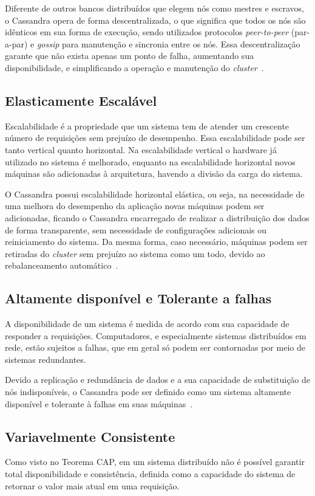 Diferente de outros bancos distribuídos que elegem nós como mestres e escravos, o Cassandra opera de forma descentralizada, o que significa que todos os nós são idênticos em sua forma de execução, sendo utilizados protocolos \emph{peer-to-peer} (par-a-par) e \emph{gossip} para manutenção e sincronia entre os nós. Essa descentralização garante que não exista apenas um ponto de falha, aumentando sua disponibilidade, e simplificando a operação e manutenção do \emph{cluster}~\cite{cassandraguide}.

\subsection*{Elasticamente Escalável}
Escalabilidade é a propriedade que um sistema tem de atender um crescente número de requisições sem prejuízo de desempenho. Essa escalabilidade pode ser tanto vertical quanto horizontal. Na escalabilidade vertical o hardware já utilizado no sistema é melhorado, enquanto na escalabilidade horizontal novos máquinas são adicionadas à arquitetura, havendo a divisão da carga do sistema.

O Cassandra possui escalabilidade horizontal elástica, ou seja, na necessidade de uma melhora do desempenho da aplicação novas máquinas podem ser adicionadas, ficando o Cassandra encarregado de realizar a distribuição dos dados de forma transparente, sem necessidade de configurações adicionais ou reiniciamento do sistema. Da mesma forma, caso necessário, máquinas podem ser retiradas do \emph{cluster} sem prejuízo ao sistema como um todo, devido ao rebalanceamento automático~\cite{cassandraguide}.

\subsection*{Altamente disponível e Tolerante a falhas}
A disponibilidade de um sistema é medida de acordo com sua capacidade de responder a requisições. Computadores, e especialmente sistemas distribuídos em rede, estão sujeitos a falhas, que em geral só podem ser contornadas por meio de sistemas redundantes.

Devido a replicação e redundância de dados e a sua capacidade de substituição de nós indisponíveis, o Cassandra pode ser definido como um sistema altamente disponível e tolerante à falhas em suas máquinas~\cite{cassandraguide}.

\subsection*{Variavelmente Consistente}
Como visto no Teorema CAP, em um sistema distribuído não é possível garantir total disponibilidade e consistência, definida como a capacidade do sistema de retornar o valor mais atual em uma requisição.

